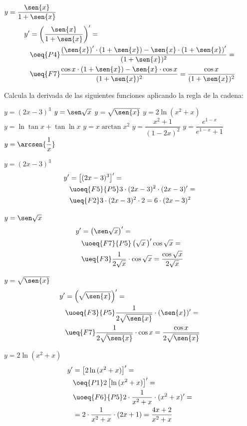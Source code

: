 \begin{ejemplo}
\quad $y=\dfrac{\sen{x}}{1+\sen{x}}$
\[\begin{aligned}
    y'&=\left(\frac{\sen{x}}{1+\sen{x}}\right)'=\\
        &\oeq{P4}\dfrac{\left(\sen{x}\right)'\cdot(1+\sen{x})-\sen{x}\cdot\left(1+\sen{x}\right)'}{(1+\sen{x})^2}=\\
        &\ueq{F7}\dfrac{\cos{x}\cdot(1+\sen{x})-\sen{x}\cdot\cos{x}}{(1+\sen{x})^2}=\frac{\cos{x}}{(1+\sen{x})^2}
\end{aligned}\]

\end{ejemplo}

\begin{ejemplo}{
Calcula la derivada de las siguientes funciones aplicando la regla de la cadena:
 \begin{apartadosc}
  \ap $y=(2x-3)^3$
  \ap $y=\sen\sqrt{x}$
  \ap $y=\sqrt{\sen{x}}$
  \ap $y=2\ln{(x^2+x)}$
  \ap $y=\ln{\tan{x}+\tan{\ln{x}}}$
  \ap $y=x\arctan{x^2}$
  \ap $y=\dfrac{x^2+1}{(1-2x)^2}$
  \ap $y=\dfrac{e^{1-x}}{e^{1-x}+1}$
  \ap $y=\arcsen{\dfrac1x}$
 \end{apartadosc}}
 \quad $y=(2x-3)^3$
\[\begin{aligned}
    y'&=\left[(2x-3)^3\right]'=\\
        &\uoeq{F5}{P5}3\cdot(2x-3)^2\cdot(2x-3)'=\\
        &\ueq{F2}3\cdot(2x-3)^2\cdot2=6\cdot(2x-3)^2
\end{aligned}\]

 \quad $y=\sen\sqrt{x}$
\[\begin{aligned}
    y'&=\left(\sen\sqrt{x}\right)'=\\
        &\uoeq{F7}{P5}\left(\sqrt{x}\,\right)'\cos\sqrt{x}=\\
        &\ueq{F3}\frac1{2\sqrt{x}}\cdot\cos\sqrt{x}=\frac{\cos\sqrt{x}}{2\sqrt{x}}
\end{aligned}\]

 \quad $y=\sqrt{\sen{x}}$
\[\begin{aligned}
    y'&=\left(\sqrt{\sen{x}}\right)'=\\
        &\uoeq{F3}{P5}\frac1{2\sqrt{\sen{x}}}\cdot(\sen{x})'=\\
        &\ueq{F7}\frac1{2\sqrt{\sen{x}}}\cdot\cos{x}=\frac{\cos{x}}{2\sqrt{\sen{x}}}
\end{aligned}\]

 \quad $y=2\ln{(x^2+x)}$
\[\begin{aligned}
    y'&=\left[2\ln{(x^2+x)}\right]'=\\
        &\oeq{P1}2\left[\ln{(x^2+x)}\right]'=\\
        &\uoeq{F6}{P5}2\cdot\frac1{x^2+x}\cdot(x^2+x)'=\\
        &=2\cdot\frac1{x^2+x}\cdot(2x+1)=\frac{4x+2}{x^2+x}
\end{aligned}\]


\end{ejemplo}
